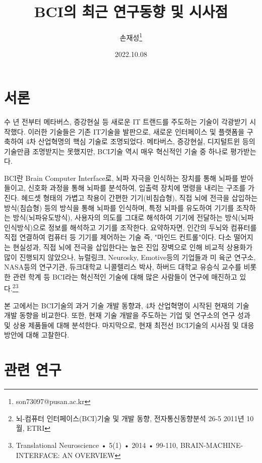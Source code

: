 \documentclass[11pt, a4paper]{article}
\begin{document}
\title{BCI의 최근 연구동향 및 시사점}
\author{손재성\footnote{son73097@pusan.ac.kr}}
\date{2022.10.08}
\maketitle

\section{서론}
수 년 전부터 메타버스, 증강현실 등 새로운 IT 트랜드를 주도하는 기술이 각광받기 시작했다. 이러한 기술들은 기존 IT기술을 발판으로, 새로운 인터페이스 및 플랫폼을 구축하여 4차 산업혁명의 핵심 기술로 조명되었다. 메타버스, 증강현실, 디지털트윈 등의 기술만큼 조명받지는 못했지만, BCI기술 역시 매우 혁신적인 기술 중 하나로 평가받는다.

 BCI란 Brain Computer Interface로, 뇌파 자극을 인식하는 장치를 통해 뇌파를 받아들이고, 신호화 과정을 통해 뇌파를 분석하여, 입출력 장치에 명령을 내리는 구조를 가진다. 헤드셋 형태의 가볍고 착용이 간편한 기기(비침습형), 직접 뇌에 전극을 삽입하는 방식(침습형) 등의 방식을 통해 뇌파를 인식하며, 특정 뇌파를 유도하여 기기를 조작하는 방식(뇌파유도방식), 사용자의 의도를 그대로 해석하여 기기에 전달하는 방식(뇌파인식방식)으로 정보를 해석하고 기기를 조작한다. 요약하자면, 인간의 두뇌와 컴퓨터를 직접 연결하여 컴퓨터 등 기기를 제어하는 기술 즉, "마인드 컨트롤"이다. 다소 떨어지는 현실성과, 직접 뇌에 전극을 삽입한다는 높은 진입 장벽으로 인해 비교적 상용화가 많이 진행되지 않았으나, 뉴럴링크, Neurosky, Emotive등의 기업들과 미 육군 연구소, NASA등의 연구기관, 듀크대학교 니콜렐리스 박사, 하버드 대학교 유승식 교수를 비롯한 관련 학계 등 BCI라는 혁신적인 기술에 대해 많은 사람들이 연구에 매진하고 있다.\footnote{뇌-컴퓨터 인터페이스(BCI)기술 및 개발 동향, 전자통신동향분석 26-5 2011년 10월, ETRI}\footnote{Translational Neuroscience • 5(1) • 2014 • 99-110, BRAIN-MACHINE-INTERFACE: AN OVERVIEW}

  본 고에서는 BCI기술의 과거 기술 개발 동향과, 4차 산업혁명이 시작된 현재의 기술 개발 동향을 비교한다. 또한, 현재 기술 개발을 주도하는 기업 및 연구소의 연구 성과 및 상용 제품들에 대해 분석한다. 마지막으로, 현재 최전선 BCI기술의 시사점 및 대응 방안에 대해 고찰한다.

\section{관련 연구}
\end{document}

